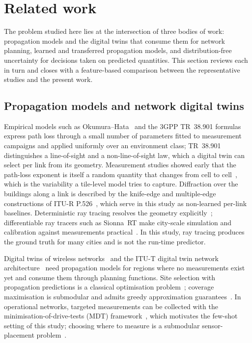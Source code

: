 \section{Related work}
\label{sec:related}

The problem studied here lies at the intersection of three bodies of work:
propagation models and the digital twins that consume them for network
planning, learned and transferred propagation models, and distribution-free
uncertainty for decisions taken on predicted quantities. This section
reviews each in turn and closes with a feature-based comparison between the
representative studies and the present work.

\subsection{Propagation models and network digital twins}
Empirical models such as Okumura--Hata~\cite{hata1980} and the 3GPP
TR~38.901 formulas~\cite{tr38901} express path loss through a small number
of parameters fitted to measurement campaigns and applied uniformly over an
environment class; TR~38.901 distinguishes a line-of-sight and a
non-line-of-sight law, which a digital twin can select per link from its
geometry. Measurement studies showed early that the path-loss exponent is
itself a random quantity that changes from cell to cell~\cite{erceg1999},
which is the variability a tile-level model tries to capture. Diffraction
over the buildings along a link is described by the knife-edge and
multiple-edge constructions of ITU-R P.526~\cite{itup526}, which serve in
this study as non-learned per-link baselines. Deterministic ray tracing
resolves the geometry explicitly~\cite{yun2015raytracing}; differentiable
ray tracers such as Sionna~RT make city-scale simulation and calibration
against measurements practical~\cite{hoydis2023sionna,hoydis2024learning}.
In this study, ray tracing produces the ground truth for many cities and is
not the run-time predictor.

Digital twins of wireless networks~\cite{khan2022dt,alkhateeb2023dt} and the
ITU-T digital twin network architecture~\cite{ituy3090} need propagation
models for regions where no measurements exist yet and consume them through
planning functions. Site selection with propagation predictions is a
classical optimisation problem~\cite{amaldi2003}; coverage maximisation is
submodular and admits greedy approximation guarantees~\cite{nemhauser1978}.
In operational networks, targeted measurements can be collected with the
minimisation-of-drive-tests (MDT) framework~\cite{johansson2012mdt,ts37320},
which motivates the few-shot setting of this study; choosing where to
measure is a submodular sensor-placement problem~\cite{krause2008}.

